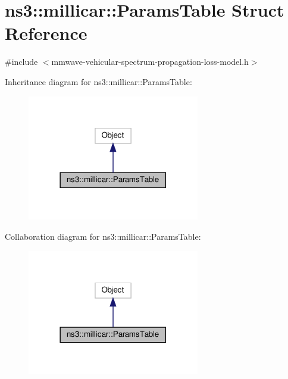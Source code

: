 \hypertarget{structns3_1_1millicar_1_1ParamsTable}{}\section{ns3\+:\+:millicar\+:\+:Params\+Table Struct Reference}
\label{structns3_1_1millicar_1_1ParamsTable}


{\ttfamily \#include $<$mmwave-\/vehicular-\/spectrum-\/propagation-\/loss-\/model.\+h$>$}



Inheritance diagram for ns3\+:\+:millicar\+:\+:Params\+Table\+:\nopagebreak
\begin{figure}[H]
\begin{center}
\leavevmode
\includegraphics[width=213pt]{structns3_1_1millicar_1_1ParamsTable__inherit__graph}
\end{center}
\end{figure}


Collaboration diagram for ns3\+:\+:millicar\+:\+:Params\+Table\+:\nopagebreak
\begin{figure}[H]
\begin{center}
\leavevmode
\includegraphics[width=213pt]{structns3_1_1millicar_1_1ParamsTable__coll__graph}
\end{center}
\end{figure}
